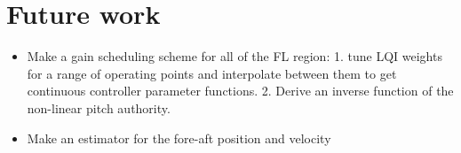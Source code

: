 \section{Future work} \label{sec:future}

\begin{itemize}
	\item Make a gain scheduling scheme for all of the FL region: 1. tune LQI weights for a range of operating points and interpolate between them to get continuous controller parameter functions. 2. Derive an inverse function of the non-linear pitch authority. 
	\item Make an estimator for the fore-aft position and velocity
\end{itemize}